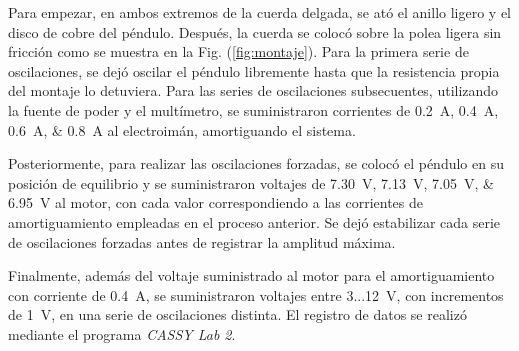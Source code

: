 Para empezar, en ambos extremos de la cuerda delgada, se ató el anillo ligero y el
disco de cobre del péndulo. Después, la cuerda se colocó sobre la polea ligera sin fricción
como se muestra en la Fig. (\ref{fig:montaje}). Para la primera serie de oscilaciones, se
dejó oscilar el péndulo libremente hasta que la resistencia propia del montaje lo detuviera.
Para las series de oscilaciones subsecuentes, utilizando la fuente de poder y el multímetro,
se suministraron corrientes de \qtylist{0,2;0,4;0,6;0,8}{\ampere} al electroimán, amortiguando
el sistema. 

Posteriormente, para realizar las oscilaciones forzadas, se colocó el péndulo en su posición de
equilibrio y se suministraron voltajes de \qtylist{7,30;7,13;7,05;6,95}{\volt} al motor,
con cada valor correspondiendo a las corrientes de amortiguamiento empleadas en el proceso
anterior. Se dejó estabilizar cada serie de oscilaciones forzadas antes de registrar la
amplitud máxima.

Finalmente, además del voltaje suministrado al motor para el amortiguamiento
con corriente de \qty{0,4}{\ampere}, se suministraron voltajes entre 3...\qty{12}{\volt}, con
incrementos de \qty{1}{\volt}, en una serie de oscilaciones distinta. El registro de datos se
realizó mediante el programa \textit{CASSY Lab 2}.